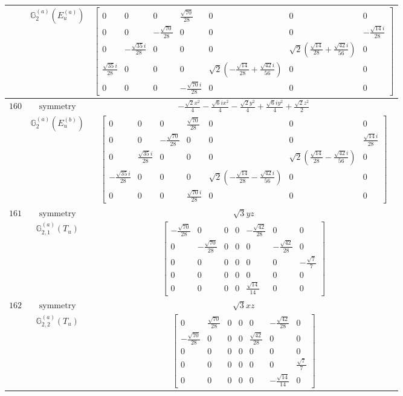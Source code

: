 \documentclass[fleqn,8pt,landscape]{jsarticle}
\begin{document}
\begin{longtable}{ccc}
$  $ & $ \mathbb{G}_{2}^{(a)}(E_{u}^{(a)}) $ & $ \begin{bmatrix} 0 & 0 & 0 & \frac{\sqrt{70}}{28} & 0 & 0 & 0 \\ 0 & 0 & - \frac{\sqrt{70}}{28} & 0 & 0 & 0 & - \frac{\sqrt{14} i}{28} \\ 0 & - \frac{\sqrt{35} i}{28} & 0 & 0 & 0 & \sqrt{2} \left(\frac{\sqrt{14}}{28} + \frac{\sqrt{42} i}{56}\right) & 0 \\ \frac{\sqrt{35} i}{28} & 0 & 0 & 0 & \sqrt{2} \left(- \frac{\sqrt{14}}{28} + \frac{\sqrt{42} i}{56}\right) & 0 & 0 \\ 0 & 0 & 0 & - \frac{\sqrt{70} i}{28} & 0 & 0 & 0 \end{bmatrix} $ \\ \hline
$ 160 $ & $ \text{symmetry} $ & $ - \frac{\sqrt{2} x^{2}}{4} - \frac{\sqrt{6} i x^{2}}{4} - \frac{\sqrt{2} y^{2}}{4} + \frac{\sqrt{6} i y^{2}}{4} + \frac{\sqrt{2} z^{2}}{2} $ \\
$  $ & $ \mathbb{G}_{2}^{(a)}(E_{u}^{(b)}) $ & $ \begin{bmatrix} 0 & 0 & 0 & \frac{\sqrt{70}}{28} & 0 & 0 & 0 \\ 0 & 0 & - \frac{\sqrt{70}}{28} & 0 & 0 & 0 & \frac{\sqrt{14} i}{28} \\ 0 & \frac{\sqrt{35} i}{28} & 0 & 0 & 0 & \sqrt{2} \left(\frac{\sqrt{14}}{28} - \frac{\sqrt{42} i}{56}\right) & 0 \\ - \frac{\sqrt{35} i}{28} & 0 & 0 & 0 & \sqrt{2} \left(- \frac{\sqrt{14}}{28} - \frac{\sqrt{42} i}{56}\right) & 0 & 0 \\ 0 & 0 & 0 & \frac{\sqrt{70} i}{28} & 0 & 0 & 0 \end{bmatrix} $ \\ \hline
$ 161 $ & $ \text{symmetry} $ & $ \sqrt{3} y z $ \\
$  $ & $ \mathbb{G}_{2,1}^{(a)}(T_{u}) $ & $ \begin{bmatrix} - \frac{\sqrt{70}}{28} & 0 & 0 & 0 & - \frac{\sqrt{42}}{28} & 0 & 0 \\ 0 & - \frac{\sqrt{70}}{28} & 0 & 0 & 0 & - \frac{\sqrt{42}}{28} & 0 \\ 0 & 0 & 0 & 0 & 0 & 0 & - \frac{\sqrt{7}}{7} \\ 0 & 0 & 0 & 0 & 0 & 0 & 0 \\ 0 & 0 & 0 & 0 & \frac{\sqrt{14}}{14} & 0 & 0 \end{bmatrix} $ \\ \hline
$ 162 $ & $ \text{symmetry} $ & $ \sqrt{3} x z $ \\
$  $ & $ \mathbb{G}_{2,2}^{(a)}(T_{u}) $ & $ \begin{bmatrix} 0 & \frac{\sqrt{70}}{28} & 0 & 0 & 0 & - \frac{\sqrt{42}}{28} & 0 \\ - \frac{\sqrt{70}}{28} & 0 & 0 & 0 & \frac{\sqrt{42}}{28} & 0 & 0 \\ 0 & 0 & 0 & 0 & 0 & 0 & 0 \\ 0 & 0 & 0 & 0 & 0 & 0 & \frac{\sqrt{7}}{7} \\ 0 & 0 & 0 & 0 & 0 & - \frac{\sqrt{14}}{14} & 0 \end{bmatrix} $ \\ \hline

\end{longtable}
\end{document}
